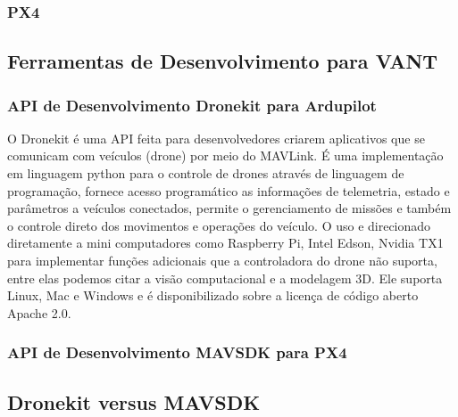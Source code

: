 \subsubsection{PX4}

\subsection{Ferramentas de Desenvolvimento para VANT}

\subsubsection{API de Desenvolvimento Dronekit para Ardupilot}
O Dronekit é uma API feita para desenvolvedores criarem aplicativos que se comunicam com veículos (drone) por meio do MAVLink. É uma implementação em linguagem python para o controle de drones através de linguagem de programação, fornece acesso programático as informações de telemetria, estado e parâmetros a veículos conectados, permite o gerenciamento de missões e também o controle direto dos movimentos e operações do veículo.
O uso e direcionado diretamente a mini computadores como Raspberry Pi, Intel Edson, Nvidia TX1 para implementar funções adicionais que a controladora do drone não suporta, entre elas podemos citar a visão computacional e a modelagem 3D. Ele suporta Linux, Mac e Windows e é disponibilizado sobre a licença de código aberto Apache 2.0.

\subsubsection{API de Desenvolvimento MAVSDK para PX4}


\subsection{Dronekit versus MAVSDK}


